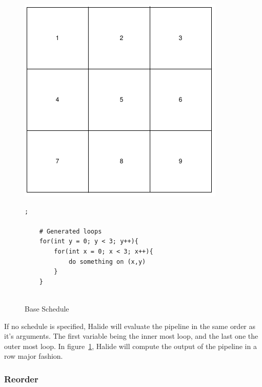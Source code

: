 \begin{figure}[h]
		\begin{minipage}[c]{\EIW}
			\centering
		\includegraphics[width=\textwidth]{Images/BaseOrder.png}
		\end{minipage}
		\begin{minipage}[c]{\ECW}
			\centering
\begin{lstlisting}[label={code:reorder}];
			
	# Generated loops
	for(int y = 0; y < 3; y++){
		for(int x = 0; x < 3; x++){
			do something on (x,y)
		}
	}
	
\end{lstlisting}
		\end{minipage}
	\caption{Base Schedule}
	\label{schedule:default}
\end{figure}



	If no schedule is specified, Halide will evaluate the pipeline in the same order as it's arguments. The first variable being the inner most loop, and the last one the outer most loop. In figure~\ref{schedule:default}, Halide will compute the output of the pipeline in a row major fashion.

	\subsubsection{Reorder}

